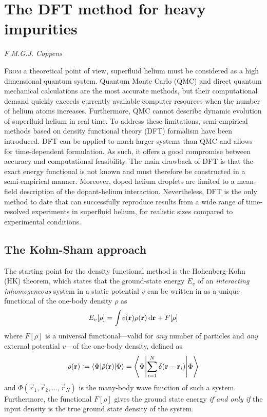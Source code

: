 \chapter{The DFT method for heavy impurities}\label{sec:dft-method}
	\epigraph{}{\textit{F.M.G.J. Coppens}}

	\lettrine[lines=4]{\color{activeColor}F}{rom} a theoretical point of view, superfluid helium must be considered as a high dimensional quantum system. Quantum Monte Carlo\citep{Kro02} (QMC) and direct quantum mechanical \citep{deL06,deL10,Agu13} calculations are the most accurate methods, but their computational demand quickly exceeds currently available computer resources when the number of helium atoms increases. Furthermore, QMC cannot describe dynamic evolution of superfluid helium in real time. To address these limitations, semi-empirical methods based on  density functional theory (DFT) formalism have been introduced\citep{Str87a,Str87b,Dal95}. DFT can be applied to much larger systems than QMC and allows for time-dependent formulation. As such, it offers a good compromise between accuracy and computational feasibility. The main drawback of DFT is that the exact energy functional is not known and must therefore be constructed in a semi-empirical manner. Moreover, doped helium droplets are limited to a mean-field description of the dopant-helium interaction. Nevertheless, DFT is the only method to date that can successfully reproduce results from a wide range of time-resolved experiments in superfluid helium, for realistic sizes compared to experimental conditions.
	
	\section{The Kohn-Sham approach}	\label{sec:kohn-sham}
		The starting point for the density functional method is the Hohenberg-Kohn (HK) theorem\citep{Hohenberg1964}, which states that the ground-state energy $E_v$ of an \emph{interacting inhomogeneous} system in a static potential $v$ can be written in as a unique functional of the one-body density $\rho$ as
		\begin{align}
			E_v[\rho] = \int\!v(\bm{\mathrm{r}})\rho(\bm{\mathrm{r}})\,\mathrm{d}{\bm{\mathrm{r}}}+F[\rho] \label{eq1}
		\end{align}
		where $F[\rho]$ is a universal functional---valid for \emph{any} number of particles and \emph{any} external potential $v$---of the one-body density, defined as
		\begin{align}\label{eq:density-operator}
			\rho(\vec{r}) \vcentcolon= \ev**{\hat\rho(\vec{r})}{\Phi} = \ev**{\sum _{i=1}^{N}\delta(\vec{r}-\vec{r}_i)}{\Phi}
		\end{align}
		and $\Phi(\vec{r}_1,\vec{r}_2,\ldots,\vec{r}_N)$ is the many-body wave function of such a system. Furthermore, the functional $F[\rho]$ gives the ground state energy \emph{if and only if} the input density is the true ground state density of the system.
		
